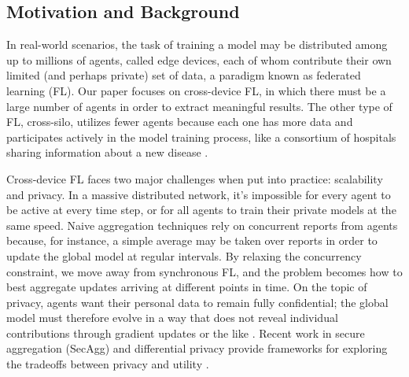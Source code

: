 \documentclass{article}
\begin{document}
\subsection{Motivation and Background}

In real-world scenarios, the task of training a model may be distributed among up to millions of agents, called edge devices, each of whom contribute their own limited (and perhaps private) set of data, a paradigm known as federated learning (FL). Our paper focuses on cross-device FL, in which there must be a large number of agents in order to extract meaningful results. The other type of FL, cross-silo, utilizes fewer agents because each one has more data and participates actively in the model training process, like a consortium of hospitals sharing information about a new disease \cite{huang2022crosssilo}.

Cross-device FL faces two major challenges when put into practice: scalability and privacy. In a massive distributed network, it's impossible for every agent to be active at every time step, or for all agents to train their private models at the same speed. Naive aggregation techniques rely on concurrent reports from agents because, for instance, a simple average may be taken over reports in order to update the global model at regular intervals. By relaxing the concurrency constraint, we move away from synchronous FL, and the problem becomes how to best aggregate updates arriving at different points in time. On the topic of privacy, agents want their personal data to remain fully confidential; the global model must therefore evolve in a way that does not reveal individual contributions through gradient updates or the like \cite{nguyen2022federated}. Recent work in secure aggregation (SecAgg) and differential privacy provide frameworks for exploring the tradeoffs between privacy and utility \cite{kadhe2020fastsecagg}.
\end{document}

